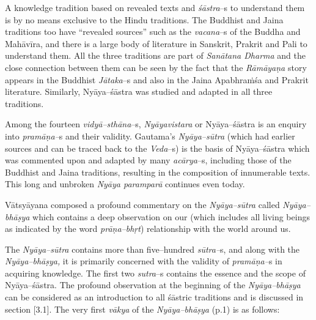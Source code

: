 A knowledge tradition based on revealed texts and \textit{śāstra}–s to understand them is by no means exclusive to the Hindu traditions. The Buddhist and Jaina traditions too have “revealed sources” such as the \textit{vacana}–s of the Buddha and Mahāvīra, and there is a large body of literature in Sanskrit, Prakrit and Pali to understand them. All the three traditions are part of \textit{Sanātana Dharma} and the close connection between them can be seen by the fact that the \textit{Rāmāyaṇa} story appears in the Buddhist \textit{Jātaka}–s and also in the Jaina Apabhraṁśa and Prakrit literature. Similarly, Nyāya–śāstra was studied and adapted in all three traditions.

Among the fourteen \textit{vidyā–sthāna}–s, \textit{Nyāyavistara} or Nyāya–śāstra is an enquiry into \textit{pramāṇa–}s and their validity. Gautama’s \textit{Nyāya–sūtra} (which had earlier sources and can be traced back to the \textit{Veda}–s) is the basis of Nyāya–śāstra which was commented upon and adapted by many \textit{acārya}–s, including those of the Buddhist and Jaina traditions, resulting in the composition of innumerable texts. This long and unbroken \textit{Nyāya paramparā} continues even today.

Vātsyāyana composed a profound commentary on the \textit{Nyāya–sūtra} called \textit{Nyāya–bhāṣya} which contains a deep observation on our (which includes all living beings as indicated by the word \textit{prāṇa–bhṛt}) relationship with the world around us.


The \textit{Nyāya–sūtra} contains more than five–hundred \textit{sūtra–}s, and along with the \textit{Nyāya–bhāṣya,} it is primarily concerned with the validity of \textit{pramāṇa–}s in acquiring knowledge. The first two \textit{sutra}–s contains the essence and the scope of Nyāya–śāstra. The profound observation at the beginning of the \textit{Nyāya–bhāṣya} can be considered as an introduction to all śāstric traditions and is discussed in section [3.1]. The very first \textit{vākya} of the \textit{Nyāya–bhāṣya} (p.1) is as follows:

